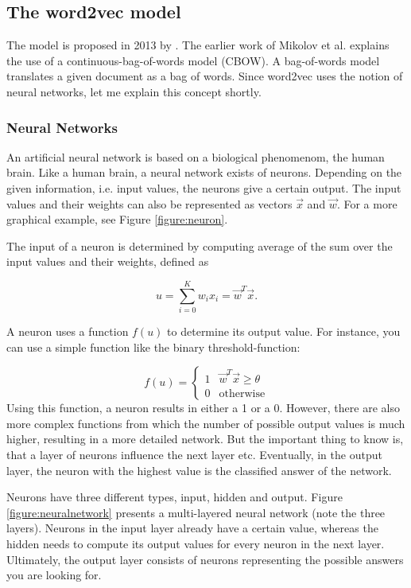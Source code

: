 \documentclass[a4paper,11pt]{article}
\begin{document}
\subsection{The word2vec model}
\label{section:word2vec}
The model is proposed in 2013 by \cite{Mikolov2013a,Mikolov2013b}. The earlier work of Mikolov et al. \cite{Mikolov2013a} explains the use of a continuous-bag-of-words model (CBOW). A bag-of-words model translates a given document as a bag of words. Since word2vec uses the notion of neural networks, let me explain this concept shortly. 

\subsubsection{Neural Networks}
An artificial neural network is based on a biological phenomenom, the human brain. Like a human brain, a neural network exists of neurons. Depending on the given information, i.e. input values, the neurons give a certain output. The input values and their weights can also be represented as vectors $\vec{x}$ and $\vec{w}$. For a more graphical example, see Figure \ref{figure:neuron}.

The input of a neuron is determined by computing average of the sum over the input values and their weights, defined as

\begin{equation}
u = \sum_{i=0}^{K}w_i x_i = \vec{w}^T \vec{x}.
\end{equation}

A neuron uses a function $f(u)$ to determine its output value. For instance, you can use a simple function like the binary threshold-function:

\begin{equation}
f(u) = \begin{cases}
1 & \vec{w}^T \vec{x} \geq \theta \\
0 & \text{otherwise}
\end{cases}
\end{equation}
Using this function, a neuron results in either a 1 or a 0. However, there are also more complex functions from which the number of possible output values is much higher, resulting in a more detailed network. But the important thing to know is, that a layer of neurons influence the next layer etc. Eventually, in the output layer, the neuron with the highest value is the classified answer of the network.

Neurons have three different types, input, hidden and output. Figure \ref{figure:neuralnetwork} presents a multi-layered neural network (note the three layers). Neurons in the input layer already have a certain value, whereas the hidden needs to compute its output values for every neuron in the next layer. Ultimately, the output layer consists of neurons representing the possible answers you are looking for. 
\end{document}
